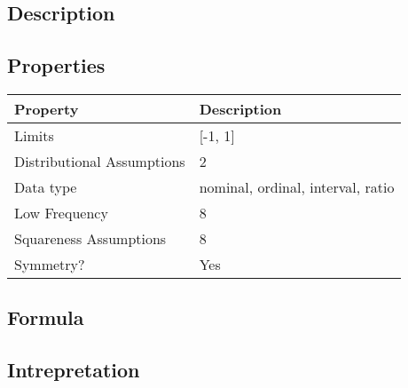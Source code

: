 \documentclass[11pt]{article}
\begin{document}
\subsection{Description}

\subsection{Properties}
\begin{tabular}{| l || l |}
    \hline
    {\bf Property} & {\bf Description} \\
    \hline
    Limits & [-1, 1] \\ \hline

    Distributional Assumptions& 2 \\ \hline

    Data type & nominal, ordinal, interval, ratio \\ \hline

    Low Frequency & 8 \\ \hline

    Squareness Assumptions & 8 \\ \hline
    
    Symmetry? & Yes \\ \hline

\end{tabular}


\subsection{Formula}

\subsection{Intrepretation}
\end{document}
